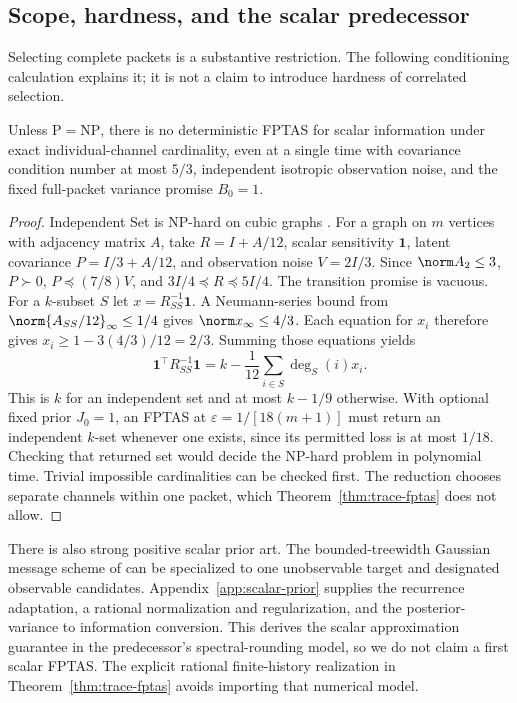 \subsection{Scope, hardness, and the scalar predecessor}
\label{subsec:approximation-scope}
Selecting complete packets is a substantive restriction. The following
conditioning calculation explains it; it is not a claim to introduce hardness
of correlated selection.
\begin{proposition}
\label{prop:channel-hardness}
Unless $\mathrm P=\mathrm{NP}$, there is no deterministic FPTAS for scalar
information under exact individual-channel cardinality, even at a single time
with covariance condition number at most $5/3$, independent isotropic
observation noise, and the fixed full-packet variance promise $B_0=1$.
\end{proposition}
\begin{proof}
Independent Set is NP-hard on cubic graphs
\citep[Theorem 4.1(a)]{Mohar2001}. For a graph on $m$ vertices with adjacency
matrix $A$, take $R=I+A/12$, scalar sensitivity $\mathbf1$, latent covariance
$P=I/3+A/12$, and observation noise $V=2I/3$. Since
$\norm A_2\le3$, $P\succ0$, $P\preceq(7/8)V$, and
$3I/4\preceq R\preceq5I/4$. The transition promise is vacuous.
For a $k$-subset $S$ let $x=R_{SS}^{-1}\mathbf1$. A Neumann-series bound
from $\norm{A_{SS}/12}_\infty\le1/4$ gives
$\norm x_\infty\le4/3$. Each equation for $x_i$ therefore gives
$x_i\ge1-3(4/3)/12=2/3$. Summing those equations yields
\[
 \mathbf1^\top R_{SS}^{-1}\mathbf1
 =k-\frac1{12}\sum_{i\in S}\deg_S(i)x_i.
\]
This is $k$ for an independent set and at most $k-1/9$ otherwise. With
optional fixed prior $J_0=1$, an FPTAS at
$\varepsilon=1/[18(m+1)]$ must return an independent $k$-set whenever one
exists, since its permitted loss is at most $1/18$. Checking that returned
set would decide the NP-hard problem in polynomial time. Trivial impossible
cardinalities can be checked first. The reduction chooses separate channels
within one packet, which Theorem~\ref{thm:trace-fptas} does not allow.
\end{proof}

There is also strong positive scalar prior art. The bounded-treewidth
Gaussian message scheme of \citet[Section 3.2, Theorem 43]{Mahalanabis2012}
can be specialized to one unobservable target and designated observable
candidates. Appendix~\ref{app:scalar-prior} supplies the recurrence adaptation,
a rational normalization and regularization, and the posterior-variance to
information conversion. This derives the scalar approximation guarantee in
the predecessor's spectral-rounding model, so we do not claim a first scalar
FPTAS. The explicit rational finite-history realization in
Theorem~\ref{thm:trace-fptas} avoids importing that numerical model.

